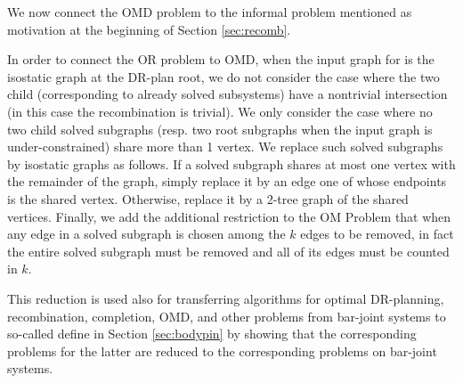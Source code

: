 We now connect the OMD problem to the informal  problem mentioned as motivation at the beginning
of Section \ref{sec:recomb}.

In order to connect the OR problem to OMD, when the input graph for is
the isostatic graph at the DR-plan root, we do not consider the case
where the two child  (corresponding to already
solved subsystems) have a nontrivial intersection (in this case the
recombination is trivial). We only consider the case where no two
child solved subgraphs (resp. two root subgraphs when the input graph
is under-constrained) share more than 1 vertex. We replace such solved
subgraphs  by isostatic graphs as follows. If a solved subgraph shares
at most one vertex with the remainder of the graph, simply replace it
by an edge one of whose endpoints  is the shared vertex. Otherwise,
replace it by  a 2-tree graph of the shared vertices. Finally, we add
the additional restriction to the OM Problem that when any edge in a
solved subgraph is chosen among the $k$ edges to be removed, in fact
the entire solved subgraph must be removed  and all of its edges must
be counted in $k$.

This reduction is used also for transferring  algorithms for optimal
DR-planning, recombination, completion, OMD, and other problems 
from bar-joint systems to 
so-called  define in Section \ref{sec:bodypin}
by showing that the corresponding problems for the latter are reduced
to the corresponding problems on bar-joint systems.

